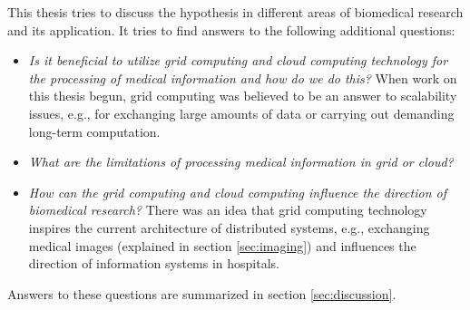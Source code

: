 This thesis tries to discuss the hypothesis in different areas of biomedical research and its application. It tries to find answers to the following additional questions:
\begin{itemize}
\item \emph{Is it beneficial to utilize grid computing and cloud computing technology for the processing of medical information and how do we do this?} When work on this thesis begun, grid computing was believed to be an answer to scalability issues, e.g., for exchanging large amounts of data or carrying out demanding long-term computation. %
\item \emph{What are the limitations of processing medical information in grid or cloud?} 
\item \emph{How can the grid computing and cloud computing influence the direction of biomedical research?} There was an idea that grid computing technology inspires the current architecture of distributed systems,  e.g., exchanging medical images (explained in section \ref{sec:imaging}) and influences the direction of information systems in hospitals. 
\end{itemize}

Answers to these questions %
are summarized in section \ref{sec:discussion}.

